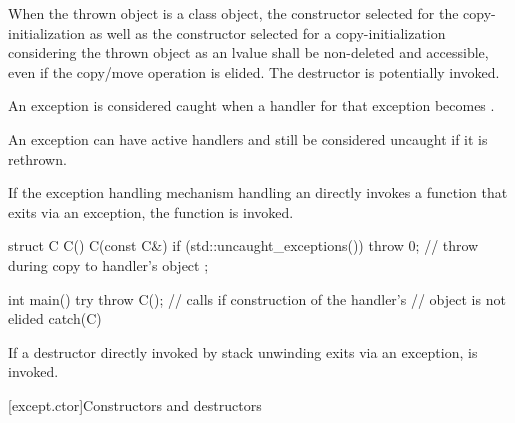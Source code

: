 \pnum
{}%
%
When the thrown object is a class object, the constructor selected for
the copy-initialization as well as the constructor selected for
a copy-initialization considering the thrown object as an lvalue
shall be non-deleted and accessible, even if the copy/move operation is
elided.
The destructor is potentially invoked.

\pnum
{}%
%
An exception is considered caught when a handler for that exception
becomes .
\begin{note}
An exception can have active handlers and still be considered uncaught if
it is rethrown.
\end{note}

\pnum
{}%
%
If the exception handling mechanism
handling an 
directly invokes a function that exits via an
exception, the function  is invoked.
\begin{example}
\begin{codeblock}
struct C {
  C() { }
  C(const C&) {
    if (std::uncaught_exceptions()) {
      throw 0;      // throw during copy to handler's  object
    }
  }
};

int main() {
  try {
    throw C();      // calls  if construction of the handler's
                    //  object is not elided
  } catch(C) { }
}
\end{codeblock}
\end{example}
\begin{note}
If a destructor directly invoked by stack unwinding exits via an exception,
 is invoked.
\end{note}


[except.ctor]{Constructors and destructors}%
%
%

